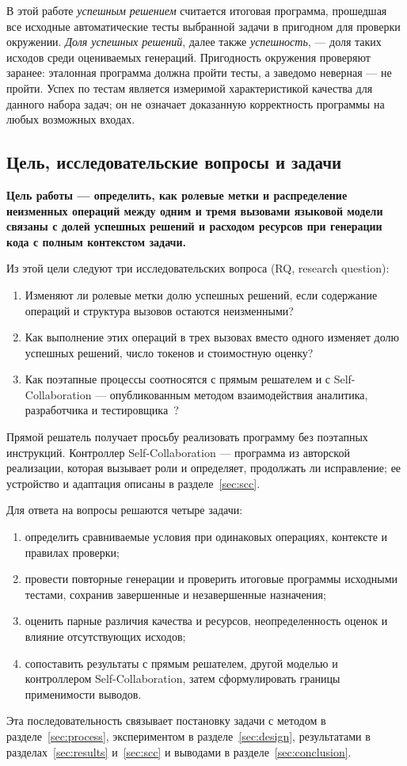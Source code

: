В этой работе \emph{успешным решением} считается итоговая программа, прошедшая все исходные автоматические тесты выбранной задачи в пригодном для проверки окружении. \emph{Доля успешных решений}, далее также \emph{успешность}, --- доля таких исходов среди оцениваемых генераций. Пригодность окружения проверяют заранее: эталонная программа должна пройти тесты, а заведомо неверная --- не пройти. Успех по тестам является измеримой характеристикой качества для данного набора задач; он не означает доказанную корректность программы на любых возможных входах.

\subsection{Цель, исследовательские вопросы и задачи}
\textbf{Цель работы --- определить, как ролевые метки и распределение неизменных операций между одним и тремя вызовами языковой модели связаны с долей успешных решений и расходом ресурсов при генерации кода с полным контекстом задачи.}

Из этой цели следуют три исследовательских вопроса (RQ, research question):
\begin{enumerate}
\item[\textbf{RQ1.}] Изменяют ли ролевые метки долю успешных решений, если содержание операций и структура вызовов остаются неизменными?
\item[\textbf{RQ2.}] Как выполнение этих операций в трех вызовах вместо одного изменяет долю успешных решений, число токенов и стоимостную оценку?
\item[\textbf{RQ3.}] Как поэтапные процессы соотносятся с прямым решателем и с Self-Collaboration --- опубликованным методом взаимодействия аналитика, разработчика и тестировщика~\cite{dong2023selfcollaboration,scc2024source}?
\end{enumerate}
Прямой решатель получает просьбу реализовать программу без поэтапных инструкций. Контроллер Self-Collaboration --- программа из авторской реализации, которая вызывает роли и определяет, продолжать ли исправление; ее устройство и адаптация описаны в разделе~\ref{sec:scc}.

Для ответа на вопросы решаются четыре задачи:
\begin{enumerate}
\item определить сравниваемые условия при одинаковых операциях, контексте и правилах проверки;
\item провести повторные генерации и проверить итоговые программы исходными тестами, сохранив завершенные и незавершенные назначения;
\item оценить парные различия качества и ресурсов, неопределенность оценок и влияние отсутствующих исходов;
\item сопоставить результаты с прямым решателем, другой моделью и контроллером Self-Collaboration, затем сформулировать границы применимости выводов.
\end{enumerate}
Эта последовательность связывает постановку задачи с методом в разделе~\ref{sec:process}, экспериментом в разделе~\ref{sec:design}, результатами в разделах~\ref{sec:results} и~\ref{sec:scc} и выводами в разделе~\ref{sec:conclusion}.

